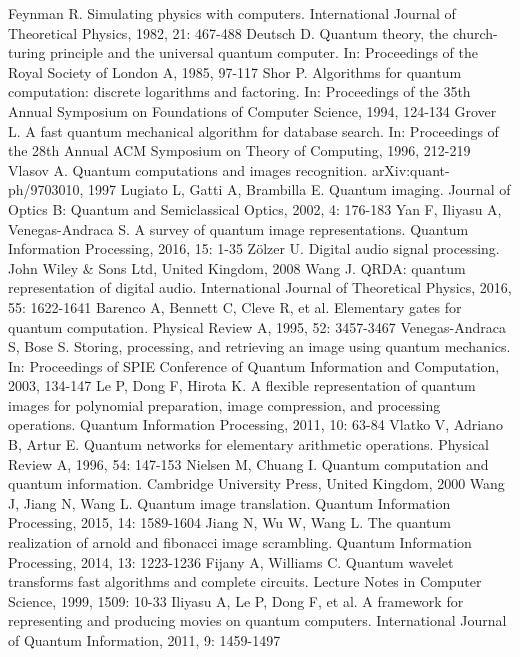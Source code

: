 \documentclass[10pt,journal,compsoc]{IEEEtran}
\begin{document}
\begin{thebibliography}{99}
 Feynman R. Simulating physics with computers. International Journal of Theoretical Physics, 1982, 21: 467-488
 Deutsch D. Quantum theory, the church-turing principle and the universal quantum computer. In: Proceedings of the Royal Society of London A, 1985, 97-117
 Shor P. Algorithms for quantum computation: discrete logarithms and factoring. In: Proceedings of the 35th Annual Symposium on Foundations of Computer Science, 1994, 124-134
 Grover L. A fast quantum mechanical algorithm for database search. In: Proceedings of the 28th Annual ACM Symposium on Theory of Computing, 1996, 212-219
 Vlasov A. Quantum computations and images recognition. arXiv:quant-ph/9703010, 1997
 Lugiato L, Gatti A, Brambilla E. Quantum imaging. Journal of Optics B: Quantum and Semiclassical Optics, 2002, 4: 176-183
 Yan F, Iliyasu A, Venegas-Andraca S. A survey of quantum image representations. Quantum Information Processing, 2016, 15: 1-35
 Z\"{o}lzer U. Digital audio signal processing. John Wiley \& Sons Ltd, United Kingdom, 2008
 Wang J. QRDA: quantum representation of digital audio. International Journal of Theoretical Physics, 2016, 55: 1622-1641
 Barenco A, Bennett C, Cleve R, et al. Elementary gates for quantum computation. Physical Review A, 1995, 52: 3457-3467
 Venegas-Andraca S, Bose S. Storing, processing, and retrieving an image using quantum mechanics. In: Proceedings of SPIE Conference of Quantum Information and Computation, 2003, 134-147
 Le P, Dong F, Hirota K. A flexible representation of quantum images for polynomial preparation, image compression, and processing operations. Quantum Information Processing, 2011, 10: 63-84
 Vlatko V, Adriano B, Artur E. Quantum networks for elementary arithmetic operations. Physical Review A, 1996, 54: 147-153
 Nielsen M, Chuang I. Quantum computation and quantum information. Cambridge University Press, United Kingdom, 2000
 Wang J, Jiang N, Wang L. Quantum image translation. Quantum Information Processing, 2015, 14: 1589-1604
 Jiang N, Wu W, Wang L. The quantum realization of arnold and fibonacci image scrambling. Quantum Information Processing, 2014, 13: 1223-1236
 Fijany A, Williams C. Quantum wavelet transforms fast algorithms and complete circuits. Lecture Notes in Computer Science, 1999, 1509: 10-33
 Iliyasu A, Le P, Dong F, et al. A framework for representing and producing movies on quantum computers. International Journal of Quantum Information, 2011, 9: 1459-1497
\end{thebibliography}
\end{document}
